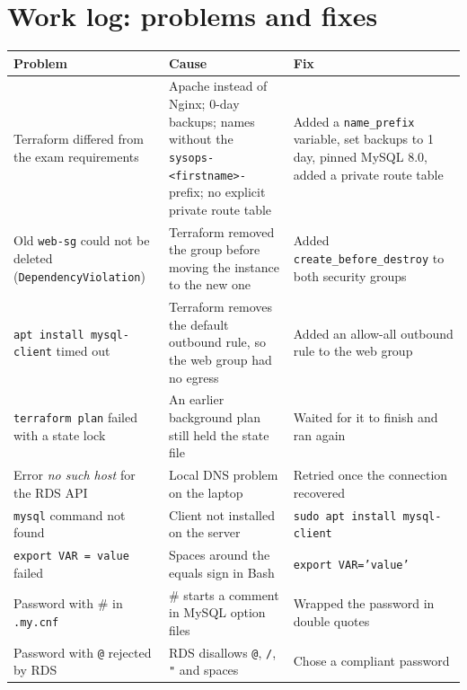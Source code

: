 \documentclass[11pt,a4paper]{article}
\newcommand{\code}[1]{\texttt{#1}}
\begin{document}
\section{Work log: problems and fixes}
\begin{longtable}{@{}p{4.3cm}p{4.6cm}p{5.4cm}@{}}
\toprule
\textbf{Problem} & \textbf{Cause} & \textbf{Fix}\\
\midrule
\endhead
Terraform differed from the exam requirements & Apache instead of Nginx; 0-day backups; names without the \code{sysops-<firstname>-} prefix; no explicit private route table & Added a \code{name\_prefix} variable, set backups to 1 day, pinned MySQL 8.0, added a private route table\\
Old \code{web-sg} could not be deleted (\code{DependencyViolation}) & Terraform removed the group before moving the instance to the new one & Added \code{create\_before\_destroy} to both security groups\\
\code{apt install mysql-client} timed out & Terraform removes the default outbound rule, so the web group had no egress & Added an allow-all outbound rule to the web group\\
\code{terraform plan} failed with a state lock & An earlier background plan still held the state file & Waited for it to finish and ran again\\
Error \emph{no such host} for the RDS API & Local DNS problem on the laptop & Retried once the connection recovered\\
\code{mysql} command not found & Client not installed on the server & \code{sudo apt install mysql-client}\\
\code{export VAR = value} failed & Spaces around the equals sign in Bash & \code{export VAR='value'}\\
Password with \# in \code{.my.cnf} & \# starts a comment in MySQL option files & Wrapped the password in double quotes\\
Password with \code{@} rejected by RDS & RDS disallows \code{@}, \code{/}, \code{"} and spaces & Chose a compliant password\\
\bottomrule
\end{longtable}

\end{document}
